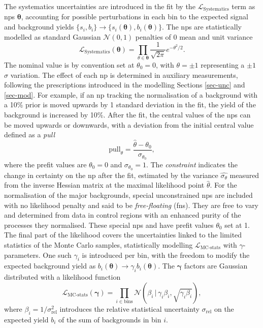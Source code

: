 The systematics uncertainties are introduced in the fit by the $\mathcal{L}_{\text{Systematics}}$ term as \glspl{np} $\boldsymbol{\theta}$, accounting for possible perturbations in each bin to the expected signal and background yields $\{s_i, b_i\} \rightarrow \{s_i(\boldsymbol{\theta}), b_i(\boldsymbol{\theta})\}$. The \glspl{np} are statistically modelled as standard Gaussian $\mathcal{N}(0, 1)$ penalties of 0 mean and unit variance \[ \mathcal{L}_{\text{Systematics}}(\boldsymbol{\theta}) = \prod_{\theta \in \boldsymbol{\theta}} \frac{1}{\sqrt{2\pi}} e^{- \theta^2/2}.\] The nominal value is by convention set at $\theta_0 = 0$, with $\theta = \pm 1$ representing a $\pm1$ $\sigma$ variation. The effect of each \gls{np} is determined in auxiliary measurements, following the prescriptions introduced in the modelling Sections \ref{sec-unc} and \ref{sec-mod}. For example, if an \gls{np} tracking the normalisation of a background with a 10\% prior is moved upwards by 1 standard deviation in the fit, the yield of the background is increased by 10\%. After the fit, the central values of the \glspl{np} can be moved upwards or downwards, with a deviation from the initial central value defined as a \textit{pull} \[ \text{pull}_{\theta} = \frac{\hat{\theta} - \theta_0}{\sigma_{\theta_0}}, \] where the prefit values are $\theta_0 = 0 $ and $\sigma_{\theta_0} = 1$. The \textit{constraint} indicates the change in certainty on the \gls{np} after the fit, estimated by the variance $\hat{\sigma_{\theta}}$ measured from the inverse Hessian matrix at the maximal likelihood point $\hat{\theta}$. For the normalisation of the major backgrounds, special unconstrained \glspl{np} are included with no likelihood penalty and said to be \textit{free-floating} (\glspl{fn}). They are free to vary and determined from data in control regions with an enhanced purity of the processes they normalised. These special \glspl{np} and have prefit values $\theta_0$ set at 1. \\

The final part of the likelihood covers the uncertainties linked to the limited statistics of the Monte Carlo samples, statistically modelling $\mathcal{L}_{\text{MC-stats}}$ with $\gamma$-parameters. One such $\gamma_i$ is introduced per bin, with the freedom to modify the expected background yield as $b_i(\boldsymbol{\theta}) \rightarrow \gamma_i b_i(\boldsymbol{\theta})$. The $\boldsymbol{\gamma}$ factors are Gaussian distributed with a likelihood function \[\mathcal{L}_{\text{MC-stats}}(\boldsymbol{\gamma}) = \prod_{i\in \textrm{bins}} \mathcal{N} \left(\beta_i \,|\, \gamma_i\beta_i, \sqrt{\gamma_i\beta_i} \right),\] where $\beta_i = 1 / \sigma_{\text{rel}}^2$ introduces the relative statistical uncertainty $\sigma_{\text{rel}}$ on the expected yield $b_i$ of the sum of backgrounds in bin $i$. \\

